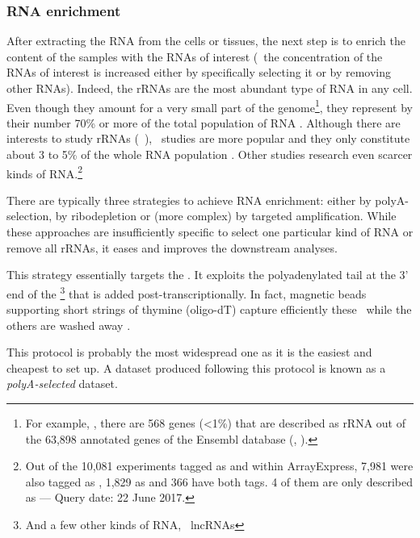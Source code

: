 \subsubsection{\gls{RNA} enrichment}

After extracting the \gls{RNA} from the cells or tissues,
the next step is to enrich the content of the samples with the \glspl{RNA}
of interest (\ie\ the concentration of the \glspl{RNA} of interest is increased
either by specifically selecting it or by removing other \glspl{RNA}). Indeed,
the \glspl{rRNA} are the most abundant type of \gls{RNA} in any cell. Even
though they amount for a very small part of the genome\footnote{For example,
, there are 568 genes (<1\%) that are described as
\gls{rRNA} out of the 63,898 annotated genes of the \gls{Ensembl} database
(, ).}, they represent by their number 70\% or more of
the total population of \gls{RNA} .
Although there are interests to study \glspl{rRNA} (\eg\ ),
\mRNAs\ studies are more
popular and they only constitute about 3 to 5\% of the whole \gls{RNA} population
. Other studies research even scarcer kinds of
\gls{RNA}.\footnote{Out of the 10,081 experiments tagged as  and  within \gls{ArrayExpress},
7,981 were also tagged as ,
1,829 as  and 366 have both tags.
4 of them are only described as  --- Query date: 22 June 2017.}

There are typically three strategies to achieve \gls{RNA} enrichment:
either by polyA-selection, by ribodepletion or (more complex)
by targeted amplification. While these
approaches are insufficiently specific to select one particular kind of \gls{RNA}
or remove all \glspl{rRNA}, it eases and improves the downstream analyses.

\label{msec:polyA}
This strategy essentially targets the \mRNAs. It exploits the polyadenylated
tail at the 3' end of the \mRNAs\footnote{And a few other kinds of \gls{RNA},
\eg\ \glspl{lncRNA} } that is added
post-transcriptionally. In fact, magnetic beads supporting short
strings of thymine (oligo-dT) capture efficiently these \mRNAs\ while the others
are washed away .

This protocol is probably the most widespread one as it is the easiest and
cheapest to set up. A dataset produced following this protocol is known as
a \emph{polyA-selected} dataset.

